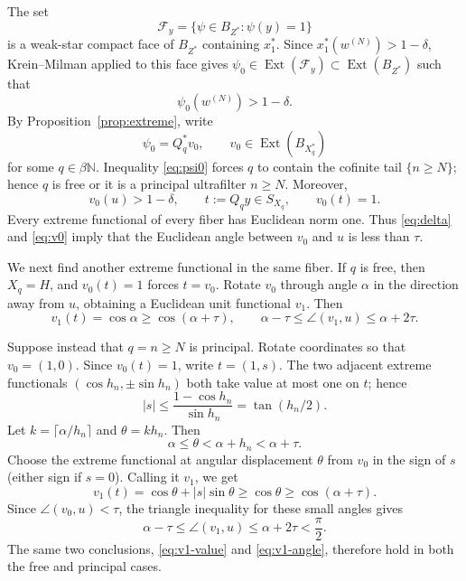 \documentclass[11pt]{article}
\theoremstyle{definition}
\newcommand{\N}{\mathbb N}
\newcommand{\Ext}{\operatorname{Ext}}
\begin{document}
The set
\[
  \mathcal F_y=\{\psi\in B_{Z^*}:\psi(y)=1\}
\]
is a weak-star compact face of $B_{Z^*}$ containing $x_1^*$.  Since
$x_1^*(w^{(N)})>1-\delta$, Krein--Milman applied to this face gives
$\psi_0\in\Ext(\mathcal F_y)\subset\Ext(B_{Z^*})$ such that
\begin{equation}\label{eq:psi0}
  \psi_0(w^{(N)})>1-\delta.
\end{equation}
By Proposition~\ref{prop:extreme}, write
\[
  \psi_0=Q_q^*v_0,
  \qquad v_0\in\Ext(B_{X_q^*})
\]
for some $q\in\beta\N$.  Inequality \eqref{eq:psi0} forces $q$ to contain
the cofinite tail $\{n\ge N\}$; hence $q$ is free or it is a principal
ultrafilter $n\ge N$.  Moreover,
\begin{equation}\label{eq:v0}
  v_0(u)>1-\delta,
  \qquad t:=Q_qy\in S_{X_q},
  \qquad v_0(t)=1.
\end{equation}
Every extreme functional of every fiber has Euclidean norm one.  Thus
\eqref{eq:delta} and \eqref{eq:v0} imply that the Euclidean angle between
$v_0$ and $u$ is less than $\tau$.

We next find another extreme functional in the same fiber.  If $q$ is free,
then $X_q=H$, and $v_0(t)=1$ forces $t=v_0$.  Rotate $v_0$ through angle
$\alpha$ in the direction away from $u$, obtaining a Euclidean unit
functional $v_1$.  Then
\[
 v_1(t)=\cos\alpha\ge\cos(\alpha+\tau),
 \qquad
 \alpha-\tau\le\angle(v_1,u)\le\alpha+2\tau.
\]

Suppose instead that $q=n\ge N$ is principal.  Rotate coordinates so that
$v_0=(1,0)$.  Since $v_0(t)=1$, write $t=(1,s)$.  The two adjacent extreme
functionals $(\cos h_n,\pm\sin h_n)$ both take value at most one on $t$;
hence
\begin{equation}\label{eq:s-bound}
  |s|\le\frac{1-\cos h_n}{\sin h_n}=\tan(h_n/2).
\end{equation}
Let $k=\lceil\alpha/h_n\rceil$ and $\theta=kh_n$.  Then
\[
  \alpha\le\theta<\alpha+h_n<\alpha+\tau.
\]
Choose the extreme functional at angular displacement $\theta$ from $v_0$
in the sign of $s$ (either sign if $s=0$).  Calling it $v_1$, we get
\begin{equation}\label{eq:v1-value}
  v_1(t)=\cos\theta+|s|\sin\theta
  \ge\cos\theta\ge\cos(\alpha+\tau).
\end{equation}
Since $\angle(v_0,u)<\tau$, the triangle inequality for these small angles
gives
\begin{equation}\label{eq:v1-angle}
  \alpha-\tau\le\angle(v_1,u)\le\alpha+2\tau<\frac\pi2.
\end{equation}
The same two conclusions, \eqref{eq:v1-value} and
\eqref{eq:v1-angle}, therefore hold in both the free and principal cases.
\end{document}
